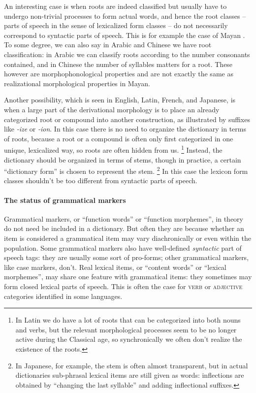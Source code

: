 \documentclass[a4paper, oneside, 12pt]{report}
\newcommand*{\citepage}[1]{p.~{#1}}
\newcommand{\form}[1]{\emph{#1}}
\newcommand*{\category}[1]{\textsc{#1}}
\begin{document}
An interesting case is when roots are indeed classified but usually have to undergo non-trivial processes to form actual words,
and hence the root classes -- parts of speech in the sense of lexicalized form classes -- do not necessarily correspond to syntactic parts of speech.
This is for example the case of Mayan \citep[\citepage{372}]{siddiqi2020routledge}.
To some degree, we can also say in Arabic and Chinese we have root classification:
in Arabic we can classify roots according to the number consonants contained,
and in Chinese the number of syllables matters for a root.
These however are morphophonological properties
and are not exactly the same as realizational morphological properties in Mayan.

Another possibility, which is seen in English, Latin, French, and Japanese,
is when a large part of the derivational morphology
is to place an already categorized root or compound into another construction,
as illustrated by suffixes like \form{-ize} or \form{-ion}.
In this case there is no need to organize the dictionary in terms of roots,
because a root or a compound is often only first categorized in one unique, lexicalized way,
so roots are often hidden from us.%
\footnote{
    In Latin we do have a lot of roots that can be categorized into both nouns and verbs,
    but the relevant morphological processes seem to be no longer active during the Classical age,
    so synchronically we often don't realize the existence of the roots.
}
Instead, the dictionary should be organized in terms of stems,
though in practice, a certain ``dictionary form'' is chosen to represent the stem.%
\footnote{
    In Japanese, for example, the stem is often almost transparent,
    but in actual dictionaries sub-phrasal lexical items are still given as words:
    inflections are obtained by ``changing the last syllable'' and adding inflectional suffixes.
}
In this case the lexicon form classes shouldn't be too different from syntactic parts of speech.

\paragraph*{The status of grammatical markers}
Grammatical markers, or ``function words'' or ``function morphemes'',
in theory do not need be included in a dictionary.
But often they are because whether an item is considered a grammatical item may vary
diachronically or even within the population.
Some grammatical markers also have well-defined \emph{syntactic} part of speech tags:
they are usually some sort of pro-forms;
other grammatical markers, like case markers, don't.
Real lexical items, or ``content words'' or ``lexical morphemes'',
may share one feature with grammatical items:
they sometimes may form closed lexical parts of speech.
This is often the case for \category{verb} or \category{adjective} categories identified in some languages.
\end{document}
